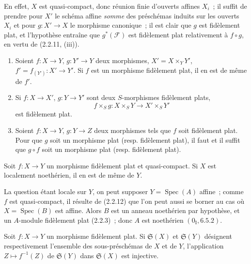 En effet, $X$ est quasi-compact, donc réunion finie d'ouverts affines $X_i$~;
il suffit de prendre pour $X'$ le schéma affine \emph{somme} des préschémas
induits sur les ouverts $X_i$ et
pour $g:X'\to X$ le morphisme canonique~; il est clair que $g$ est fidèlement
plat, et l'hypothèse entraîne que $g^*(\mathscr F)$ est fidèlement plat
relativement à $f\circ g$, en vertu de (2.2.11, (iii)).

\begin{corollary}[2.2.13]
\label{IV.2.2.13-fr}
\begin{enumerate}
\item[(i)] Soient $f:X\to Y$, $g:Y'\to Y$ deux morphismes,
$X'=X\times_Y Y'$, $f'=f_{(Y')}:X'\to Y'$. Si $f$ est un morphisme
fidèlement plat, il en est de même de $f'$.
\item[(ii)] Si $f:X\to X'$, $g:Y\to Y'$ sont deux $S$-morphismes fidèlement
plats,
\[
f\times_S g:X\times_S Y\longrightarrow X'\times_S Y'
\]
est fidèlement plat.
\item[(iii)] Soient $f:X\to Y$, $g:Y\to Z$ deux morphismes tels que $f$ soit
fidèlement plat. Pour que $g$ soit un morphisme plat (resp. fidèlement plat),
il faut et il suffit que $g\circ f$ soit un morphisme plat (resp. fidèlement
plat).
\end{enumerate}
\end{corollary}

\begin{proposition}[2.2.14]
\label{IV.2.2.14-fr}
Soit $f:X\to Y$ un morphisme fidèlement plat et quasi-compact. Si $X$ est
localement noethérien, il en est de même de $Y$.
\end{proposition}

La question étant locale sur $Y$, on peut supposer $Y=\operatorname{Spec}(A)$
affine~; comme $f$ est quasi-compact, il résulte de (2.2.12) que l'on peut
aussi se borner au cas où $X=\operatorname{Spec}(B)$ est affine. Alors $B$
est un anneau noethérien par hypothèse, et un $A$-module fidèlement plat
(2.2.3)~; donc $A$ est noethérien $(0_{\mathrm I},6.5.2)$.

\begin{proposition}[2.2.15]
\label{IV.2.2.15-fr}
Soit $f:X\to Y$ un morphisme fidèlement plat. Si $\mathfrak S(X)$ et
$\mathfrak S(Y)$ désignent respectivement l'ensemble des sous-préschémas de
$X$ et de $Y$, l'application $Z\mapsto f^{-1}(Z)$ de $\mathfrak S(Y)$ dans
$\mathfrak S(X)$ est injective.
\end{proposition}

